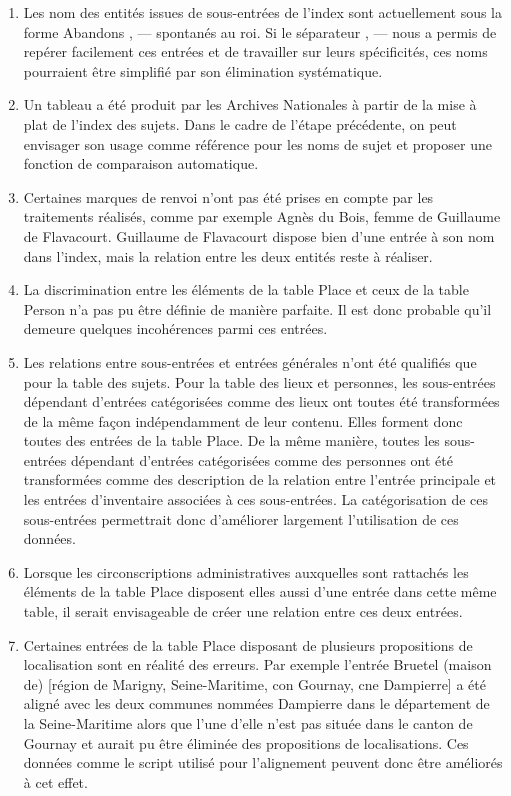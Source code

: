 \documentclass[a4paper,12pt,twoside]{book}
\begin{document}
	\begin{enumerate}
		\item Les nom des entités issues de sous-entrées de l'index sont actuellement sous la forme \og Abandons , — spontanés au roi\fg{}. Si le séparateur \og  , — \fg{} nous a permis de repérer facilement ces entrées et de travailler sur leurs spécificités, ces noms pourraient être simplifié par son élimination systématique.
		
		\item Un tableau a été produit par les Archives Nationales à partir de la mise à plat de l'index des sujets. Dans le cadre de l'étape précédente, on peut envisager son usage comme référence pour les noms de sujet et proposer une fonction de comparaison automatique.
		
		\item Certaines marques de renvoi n'ont pas été prises en compte par les traitements réalisés, comme par exemple \og Agnès du Bois, femme de Guillaume de Flavacourt\fg{}. Guillaume de Flavacourt dispose bien d'une entrée à son nom dans l'index, mais la relation entre les deux entités reste à réaliser.
		
		\item La discrimination entre les éléments de la table Place et ceux de la table Person n'a pas pu être définie de manière parfaite. Il est donc probable qu'il demeure quelques incohérences parmi ces entrées.
		
		\item Les relations entre sous-entrées et entrées générales n'ont été qualifiés que pour la table des sujets. Pour la table des lieux et personnes, les sous-entrées dépendant d'entrées catégorisées comme des lieux ont toutes été transformées de la même façon indépendamment de leur contenu. Elles forment donc toutes des entrées de la table Place. De la même manière, toutes les sous-entrées dépendant d'entrées catégorisées comme des personnes ont été transformées comme des description de la relation entre l'entrée principale et les entrées d'inventaire associées à ces sous-entrées. La catégorisation de ces sous-entrées permettrait donc d'améliorer largement l'utilisation de ces données.
		
		\item Lorsque les circonscriptions administratives auxquelles sont rattachés les éléments de la table Place disposent elles aussi d'une entrée dans cette même table, il serait envisageable de créer une relation entre ces deux entrées.
		
		\item Certaines entrées de la table Place disposant de plusieurs propositions de localisation sont en réalité des erreurs. Par exemple l'entrée \og Bruetel (maison de) [région de Marigny, Seine-Maritime, con Gournay, cne Dampierre]\fg{} a été aligné avec les deux communes nommées Dampierre dans le département de la Seine-Maritime alors que l'une d'elle n'est pas située dans le canton de Gournay et aurait pu être éliminée des propositions de localisations. Ces données comme le script utilisé pour l'alignement peuvent donc être améliorés à cet effet.
		

\end{enumerate}
\end{document}

